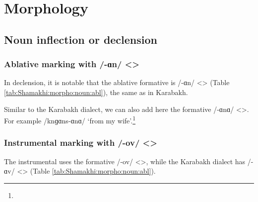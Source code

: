 \section{Morphology}
\subsection{Noun inflection or declension}

\subsubsection{Ablative marking with /-ɑn/ <>}
In declension, it is notable that the ablative formative is /-ɑn/ <> (Table \ref{tab:Shamakhi:morpho:noun:abl}), the same as in Karabakh. 


\begin{table}[H]
	\centering
	\caption{Ablatives with /-ɑn/ <> in the Shamakhi dialect}
	\label{tab:Shamakhi:morpho:noun:abl}
\end{table}




\begin{adjarianpage}\label{page:78}\end{adjarianpage}%


Similar to the Karabakh dialect, we can also add here the formative /-ɑnɑ/ <>. For example /knɡɑns-ɑnɑ/ `from my wife'.\footnote{}

\subsubsection{Instrumental marking with /-ov/ <>}
The instrumental uses the formative /-ov/ <>, while the Karabakh dialect has /-ɑv/ <> (Table \ref{tab:Shamakhi:morpho:noun:abl}). 


